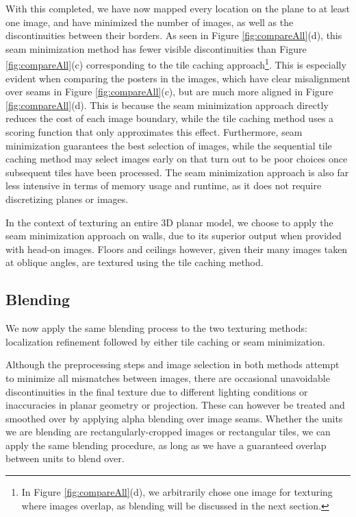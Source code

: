 \documentclass[10pt,twocolumn,letterpaper]{article}
\begin{document}
With this completed, we have now mapped every location on the plane to
at least one image, and have minimized the number of images, as well
as the discontinuities between their borders. As seen in Figure
\ref{fig:compareAll}(d), this seam minimization method has fewer
visible discontinuities than Figure \ref{fig:compareAll}(c)
corresponding to the tile caching approach\footnote{In Figure
  \ref{fig:compareAll}(d), we arbitrarily chose one image for
  texturing where images overlap, as blending will be discussed in the
  next section.}. This is especially evident when comparing the posters in the images, which have clear misalignment over seams in Figure \ref{fig:compareAll}(c), but are much more aligned in Figure \ref{fig:compareAll}(d). This is because the seam minimization approach
directly reduces the cost of each image boundary, while the tile
caching method uses a scoring function that only approximates this
effect. Furthermore, seam minimization guarantees the best selection
of images, while the sequential tile caching method may select images
early on that turn out to be poor choices once subsequent tiles have
been processed. The seam minimization approach is also far less
intensive in terms of memory usage and runtime, as it does not require
discretizing planes or images.

In the context of texturing an entire 3D planar model, we choose to
apply the seam minimization approach on walls, due to its superior
output when provided with head-on images. Floors and ceilings however,
given their many images taken at oblique angles, are textured using
the tile caching method.



\subsection{Blending}
\label{sec:blending}
We now apply the same blending process to the two texturing methods:
localization refinement followed by either tile caching or seam
minimization.

Although the preprocessing steps and image selection in both methods
attempt to minimize all mismatches between images, there are
occasional unavoidable discontinuities in the final texture due to
different lighting conditions or inaccuracies in planar geometry or
projection. These can however be treated and smoothed over by applying
alpha blending over image seams.  Whether the units we are blending
are rectangularly-cropped images or rectangular tiles, we can apply
the same blending procedure, as long as we have a guaranteed overlap
between units to blend over.
\end{document}

